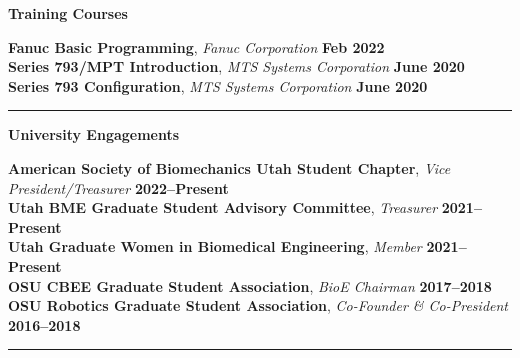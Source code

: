 \documentclass[10pt]{letter}
\begin{document}
\begin{center}
\textbf{Training Courses} \\
\end{center}
\vspace{-5pt}
\textbf{Fanuc Basic Programming}, \textit{Fanuc Corporation}
\hfill
\textbf{Feb 2022} \\
\vspace{0pt}
\textbf{Series 793/MPT Introduction}, \textit{MTS Systems Corporation}
\hfill
\textbf{June 2020} \\
\vspace{0pt}
\textbf{Series 793 Configuration}, \textit{MTS Systems Corporation}
\hfill
\textbf{June 2020} \\

\par\noindent\rule{\textwidth}{0.5pt}


\begin{center}
\textbf{\large University Engagements} \\
\end{center}
\vspace{-5pt}
\textbf{American Society of Biomechanics Utah Student Chapter}, \textit{Vice President/Treasurer}
\hfill
\textbf{2022--Present} \\
\vspace{0pt}
\textbf{Utah BME Graduate Student Advisory Committee}, \textit{Treasurer}
\hfill
\textbf{2021--Present} \\
\vspace{0pt}
\textbf{Utah Graduate Women in Biomedical Engineering}, \textit{Member}
\hfill
\textbf{2021--Present} \\
\vspace{0pt}
\textbf{OSU CBEE Graduate Student Association}, \textit{BioE Chairman}
\hfill
\textbf{2017--2018} \\
\vspace{0pt}
\textbf{OSU Robotics Graduate Student Association}, \textit{Co-Founder \& Co-President}
\hfill
\textbf{2016--2018} \\

\par\noindent\rule{\textwidth}{0.5pt}

\end{document}
